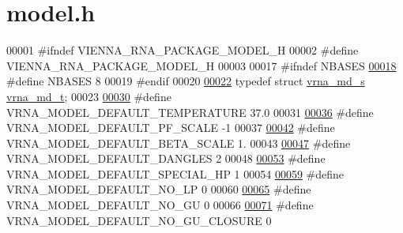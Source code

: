\hypertarget{model_8h_source}{}\section{model.\+h}
\label{model_8h_source}

\begin{DoxyCode}
00001 \textcolor{preprocessor}{#ifndef VIENNA\_RNA\_PACKAGE\_MODEL\_H}
00002 \textcolor{preprocessor}{#define VIENNA\_RNA\_PACKAGE\_MODEL\_H}
00003 
00017 \textcolor{preprocessor}{#ifndef NBASES}
\mbox{\hyperlink{group__model__details_gad554b4852cd5fec35025db8edbbba3cd}{00018}} \textcolor{preprocessor}{#define NBASES 8}
00019 \textcolor{preprocessor}{#endif}
00020 
\mbox{\hyperlink{group__model__details_ga1f8a10e12a0a1915f2a4eff0b28ea17c}{00022}} \textcolor{keyword}{typedef} \textcolor{keyword}{struct }\mbox{\hyperlink{group__model__details_structvrna__md__s}{vrna\_md\_s}} \mbox{\hyperlink{group__model__details_structvrna__md__s}{vrna\_md\_t}};
00023 
\mbox{\hyperlink{group__model__details_gaf47f9850b3b4763479f7a7e7a15648a2}{00030}} \textcolor{preprocessor}{#define VRNA\_MODEL\_DEFAULT\_TEMPERATURE    37.0}
00031 
\mbox{\hyperlink{group__model__details_ga5505389cba74a18bbc116d2bb20256fa}{00036}} \textcolor{preprocessor}{#define VRNA\_MODEL\_DEFAULT\_PF\_SCALE       -1}
00037 
\mbox{\hyperlink{group__model__details_ga383d3ac8d08c3b6221754b50871c1200}{00042}} \textcolor{preprocessor}{#define VRNA\_MODEL\_DEFAULT\_BETA\_SCALE     1.}
00043 
\mbox{\hyperlink{group__model__details_ga2aa7bc2cae774b83a5c468f824c27a42}{00047}} \textcolor{preprocessor}{#define VRNA\_MODEL\_DEFAULT\_DANGLES        2}
00048 
\mbox{\hyperlink{group__model__details_gabd1ab224e1048defd45c165ed7d1c108}{00053}} \textcolor{preprocessor}{#define VRNA\_MODEL\_DEFAULT\_SPECIAL\_HP     1}
00054 
\mbox{\hyperlink{group__model__details_gab72462726dd60ed0d43339bbf7ee08ad}{00059}} \textcolor{preprocessor}{#define VRNA\_MODEL\_DEFAULT\_NO\_LP          0}
00060 
\mbox{\hyperlink{group__model__details_ga34702f7d14d38b877ba8e475281e97e2}{00065}} \textcolor{preprocessor}{#define VRNA\_MODEL\_DEFAULT\_NO\_GU          0}
00066 
\mbox{\hyperlink{group__model__details_ga5308de46faaca4b9fd16045864901ee7}{00071}} \textcolor{preprocessor}{#define VRNA\_MODEL\_DEFAULT\_NO\_GU\_CLOSURE  0}

\end{DoxyCode}
